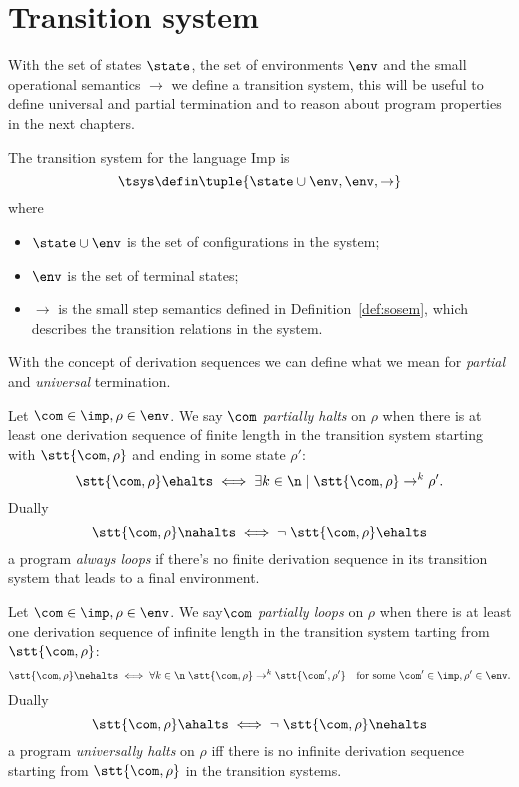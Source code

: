 \section{Transition system}

With the set of states \(\state\), the set of environments \(\env\)
and the small operational semantics \(\to\) we define a transition
system, this will be useful to define universal and partial
termination and to reason about program properties in the next
chapters.

\begin{definition} The transition system for the
  language Imp is
  \[\tsys \defin \tuple{\state \cup \env, \env, \to}\] where
  \begin{itemize}
  \item \(\state \cup \env\) is the set of configurations in the system;
  \item \(\env\) is the set of terminal states;
  \item \(\to\) is the small step semantics defined in
    Definition~\ref{def:sosem}, which describes the transition
    relations in the system.
  \end{itemize}
\end{definition}
\noindent
With the concept of derivation sequences we can define what we mean for
\emph{partial} and \emph{universal} termination.
\begin{definition}
  Let \(\com \in \imp, \rho \in \env\). We say \(\com\)
  \emph{partially halts} on \(\rho\) when there is at least one
  derivation sequence of finite length in the transition system
  starting with \(\stt{\com,\rho}\) and ending in some state
  \(\rho'\):
  \[ \stt{\com, \rho} \ehalts \iff \exists k \in \n \mid \stt{\com,
      \rho} \to^k \rho'.\] Dually
  \[ \stt{\com, \rho} \nahalts \iff \neg \; \stt{\com, \rho}
    \ehalts \] a program \emph{always loops} if there's no finite derivation sequence
  in its transition system that leads to a final environment.
\end{definition}
\begin{definition}
  Let \(\com \in \imp, \rho \in \env\). We say\(\com\) \emph{partially
    loops} on \(\rho\) when there is at least one derivation sequence
  of infinite length in the transition system tarting from
  \(\stt{\com, \rho}\):
  \[ \stt{\com, \rho} \nehalts \iff \forall k \in \n \; \stt{\com,
      \rho} \to^k \stt{\com', \rho'} \quad \text{for some }
    \com'\in\imp, \rho'\in\env.\] Dually
  \begin{equation*}
    \stt{\com, \rho} \ahalts \iff \neg \; \stt{\com, \rho}
    \nehalts
  \end{equation*}
  a program \emph{universally halts} on \(\rho\) iff there is no
  infinite derivation sequence starting from \(\stt{\com, \rho}\) in
  the transition systems.
\end{definition}

